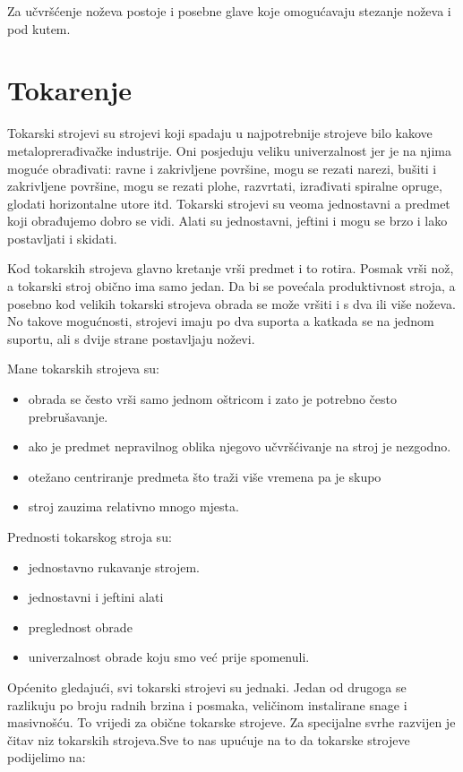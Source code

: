 \documentclass[a4paper,12pt]{article}
\numberwithin{figure}{section}
\begin{document}
\FloatBarrier
Za učvršćenje noževa postoje i posebne glave koje omogućavaju stezanje noževa i pod kutem.
\section{Tokarenje}
Tokarski strojevi su strojevi koji spadaju u najpotrebnije strojeve bilo kakove metaloprerađivačke industrije. Oni posjeduju veliku univerzalnost jer je na njima moguće obrađivati: ravne i zakrivljene površine, mogu se rezati narezi, bušiti i zakrivljene površine, mogu se rezati plohe, razvrtati, izrađivati spiralne opruge, glodati horizontalne utore itd. Tokarski strojevi su veoma jednostavni a predmet koji obrađujemo dobro se vidi. Alati su jednostavni, jeftini i mogu se brzo i lako postavljati i skidati.\par
Kod tokarskih strojeva glavno kretanje vrši predmet i to rotira. Posmak vrši nož, a tokarski stroj obično ima samo jedan. Da bi se povećala produktivnost stroja, a posebno kod velikih tokarski strojeva obrada se može vršiti i s dva ili više noževa. No takove mogućnosti, strojevi imaju po dva suporta a katkada se na jednom suportu, ali s dvije strane postavljaju noževi.\par 
Mane tokarskih strojeva su:
\begin{itemize}
\item obrada se često vrši samo jednom oštricom i zato je potrebno često prebrušavanje.
\item ako je predmet nepravilnog oblika njegovo učvršćivanje na stroj je nezgodno.
\item otežano centriranje predmeta što traži više vremena pa je skupo
\item stroj zauzima relativno mnogo mjesta.
\end{itemize}
\par
Prednosti tokarskog stroja su:
\begin{itemize}
\item jednostavno rukavanje strojem.
\item jednostavni i jeftini alati
\item preglednost obrade
\item univerzalnost obrade koju smo već prije spomenuli.
\end{itemize}
\par
Općenito gledajući, svi tokarski strojevi su jednaki. Jedan od drugoga se razlikuju po broju radnih brzina i posmaka, veličinom instalirane snage i masivnošću. To vrijedi za obične tokarske strojeve. Za specijalne svrhe razvijen je čitav niz tokarskih strojeva.Sve to nas upućuje na to da tokarske strojeve podijelimo na:
\end{document}
